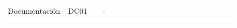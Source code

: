 \begin{longtable}[c]{llclllllllllllllllll}
        \multicolumn{1}{|l|}{Documentación}                                                   & \multicolumn{1}{l|}{DC01}                                                      & \multicolumn{1}{l|}{}                                                            & \multicolumn{1}{l|}{-}                                                               &                                 &                                 &                                 &                                 &                                 &                                 &                                 &                                 &                                 &                                 &                                 &                                 &                                 &                                 & \multicolumn{1}{l|}{}                         &  \\ \cline{1-19}
        \multicolumn{4}{|l|}{}                                                                                                                                                                                                                                                                                                                           & \multicolumn{15}{l|}{}                                                                                                                                                                                                                                                                                                                                                                                                                                                                                                                    &  \\ \cline{1-19}
        \multicolumn{1}{|l|}{}                                                                & \multicolumn{1}{l|}{}                                                          & \multicolumn{1}{l|}{}                                                            & \multicolumn{1}{l|}{}                                                                &                                 &                                 &                                 &                                 &                                 &                                 &                                 &                                 &                                 &                                 &                                 &                                 &                                 &                                 & \multicolumn{1}{l|}{}                         &  \\ \cline{1-19}

\end{longtable}
